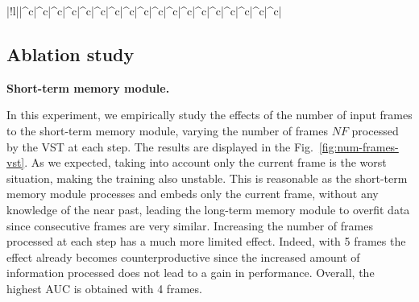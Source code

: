 \begin{table}[ht]
\begin{center}
\begin{tabular}{|!l||^c|^c|^c|^c|^c|^c|^c|^c|^c|^c|^c|^c|^c|^c|^c|^c|^c|^c|}
        \hline
\end{tabular}
	\end{center}
	\caption{Detection accuracy for each individual accident category (AUC) on VAD task. "*" indicates non-ego anomaly categories. "**" indicates input video resolution is $640\times480$ instead of $320\times240$. N.D. (Not Defined): means no value is available on paper that describes the corresponding model. Bold and red values are respectively the best and second-best results.}
	\label{tab:sota-vad-auc-per-class}
\end{table}

\subsection{Ablation study}

\noindent\textbf{Short-term memory module.}

In this experiment, we empirically study the effects of the number of input frames to the short-term memory module, varying the number of frames $NF$ processed by the VST at each step.
The results are displayed in the Fig.~\ref{fig:num-frames-vst}.
As we expected, taking into account only the current frame is the worst situation, making the training also unstable.
This is reasonable as the short-term memory module processes and embeds only the current frame, without any knowledge of the near past, leading the long-term memory module to overfit data since consecutive frames are very similar. 
Increasing the number of frames processed at each step has a much more limited effect. Indeed, with 5 frames the effect already becomes counterproductive since the increased amount of information processed does not lead to a gain in performance. Overall, the highest AUC is obtained with 4 frames.


